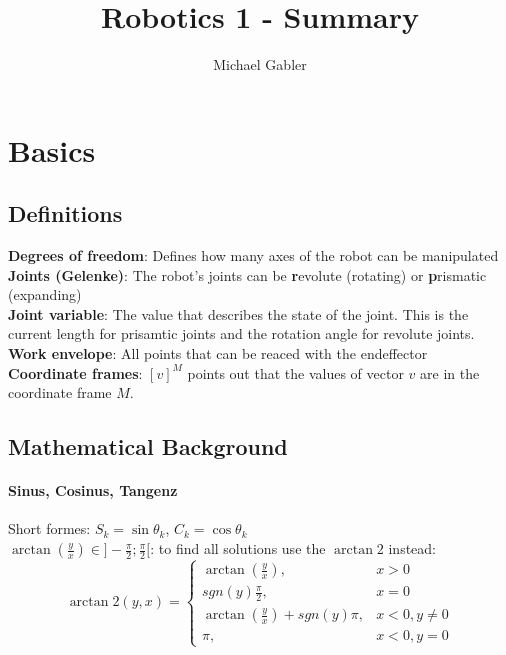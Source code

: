 \documentclass[12pt]{article}
\begin{document}
	\title{Robotics 1 - Summary}
	\author{Michael Gabler}
	\maketitle
	\tableofcontents
	\newpage
	
	\section{Basics}
	\subsection{Definitions}
	\textbf{Degrees of freedom}: Defines how many axes of the robot can be manipulated\\
	\textbf{Joints (Gelenke)}: The robot's joints can be \textbf{r}evolute (rotating) or \textbf{p}rismatic (expanding)\\
	\textbf{Joint variable}: The value that describes the state of the joint. This is the current length for prisamtic joints and the rotation angle for revolute joints.\\
	\textbf{Work envelope}: All points that can be reaced with the endeffector\\
	\textbf{Coordinate frames}: $[v]^M$ points out that the values of vector $v$ are in the coordinate frame $M$.
	
	\subsection{Mathematical Background}
	\paragraph{Sinus, Cosinus, Tangenz}
	Short formes: $S_{k} = \sin \theta_{k}$, $C_{k} = \cos \theta_{k}$\\
	$\arctan(\frac{y}{x}) \in ]-\frac{\pi}{2};\frac{\pi}{2}[$: to find all solutions use the $\arctan2$ instead:
	\begin{equation}
	\arctan2(y,x) = 
	\left\{ \begin{array}{ll}
	\arctan(\frac{y}{x}), & x > 0\\
	sgn(y)\frac{\pi}{2}, & x = 0\\
	\arctan(\frac{y}{x}) + sgn(y)\pi, & x < 0, y \neq 0\\
	\pi, & x < 0, y = 0
	\end{array} \right.
	\end{equation}
	
\end{document}
